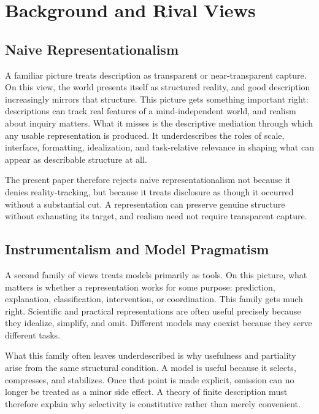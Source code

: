 \documentclass[11pt]{article}
\begin{document}
\section{Background and Rival Views}

\subsection{Naive Representationalism}

A familiar picture treats description as transparent or near-transparent capture. On this view, the world presents itself as structured reality, and good description increasingly mirrors that structure. This picture gets something important right: descriptions can track real features of a mind-independent world, and realism about inquiry matters. What it misses is the descriptive mediation through which any usable representation is produced. It underdescribes the roles of scale, interface, formatting, idealization, and task-relative relevance in shaping what can appear as describable structure at all. \cite{chakravartty_scientific_realism_sep,frigg_nguyen_scientific_representation_sep}

The present paper therefore rejects naive representationalism not because it denies reality-tracking, but because it treats disclosure as though it occurred without a substantial cut. A representation can preserve genuine structure without exhausting its target, and realism need not require transparent capture. \cite{ladyman_structural_realism_sep}

\subsection{Instrumentalism and Model Pragmatism}

A second family of views treats models primarily as tools. On this picture, what matters is whether a representation works for some purpose: prediction, explanation, classification, intervention, or coordination. This family gets much right. Scientific and practical representations are often useful precisely because they idealize, simplify, and omit. Different models may coexist because they serve different tasks. \cite{frigg_hartmann_models_sep}

What this family often leaves underdescribed is why usefulness and partiality arise from the same structural condition. A model is useful because it selects, compresses, and stabilizes. Once that point is made explicit, omission can no longer be treated as a minor side effect. A theory of finite description must therefore explain why selectivity is constitutive rather than merely convenient.
\end{document}
